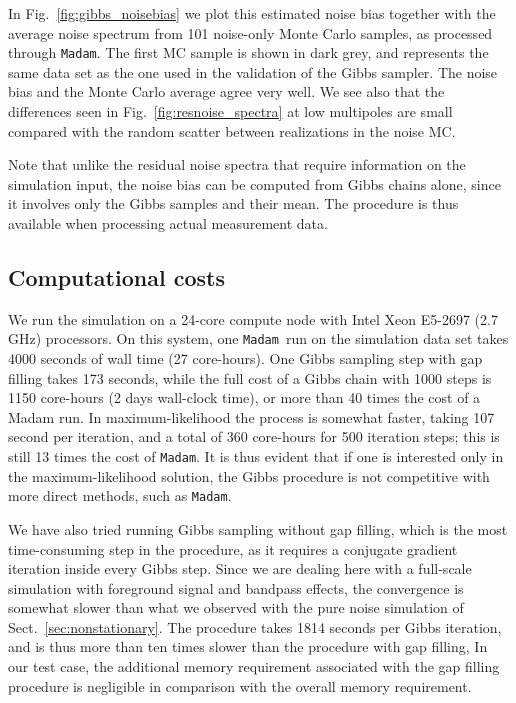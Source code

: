 \documentclass[twocolumn]{aa}
\newcommand{\Madam}{\texttt{Madam}}
\begin{document}
In Fig.~\ref{fig:gibbs_noisebias} we plot this estimated noise bias
together with the average noise spectrum from 101 noise-only Monte Carlo samples,
as processed through \Madam.  The first MC sample is shown in dark
grey, and represents the same data set as the one used in the
validation of the Gibbs sampler.  The noise bias and the Monte Carlo
average agree very well.  We see also that the differences seen in
Fig.~\ref{fig:resnoise_spectra} at low multipoles are small compared
with the random scatter between realizations in the noise MC.
 
Note that unlike the residual noise spectra that require information
on the simulation input, the noise bias can be computed from Gibbs
chains alone, since it involves only the Gibbs samples and their mean.
The procedure is thus available when processing actual measurement
data.

\subsection {Computational costs}
\label{sec:cost}

We run the simulation on a 24-core compute node with Intel Xeon
E5-2697 (2.7 GHz) processors.  On this system, one \Madam\ run on the
simulation data set takes 4000 seconds of wall time (27
core-hours).  One Gibbs sampling step with gap filling takes 173
seconds, while the full cost of a Gibbs chain with 1000 steps is 1150
core-hours (2 days wall-clock time), or more than 40 times the cost of
a Madam run.  In maximum-likelihood the process is somewhat faster,
taking 107 second per iteration, and a total of 360 core-hours for 500
iteration steps; this is still 13 times the cost of \Madam.  It is thus
evident that if one is interested only in the maximum-likelihood
solution, the Gibbs procedure is not competitive with more direct
methods, such as \Madam.

We have also tried running Gibbs sampling without gap filling, which
is the most time-consuming step in the procedure, as it requires a
conjugate gradient iteration inside every Gibbs step.  Since we are
dealing here with a full-scale simulation with foreground signal and
bandpass effects, the convergence is somewhat slower than what we
observed with the pure noise simulation of
Sect.~\ref{sec:nonstationary}.  The procedure takes 1814 seconds per
Gibbs iteration, and is thus more than ten times slower than the
procedure with gap filling,
In our test case, the additional memory requirement associated with
the gap filling procedure is negligible in comparison with the
overall memory requirement. 
\end{document}

